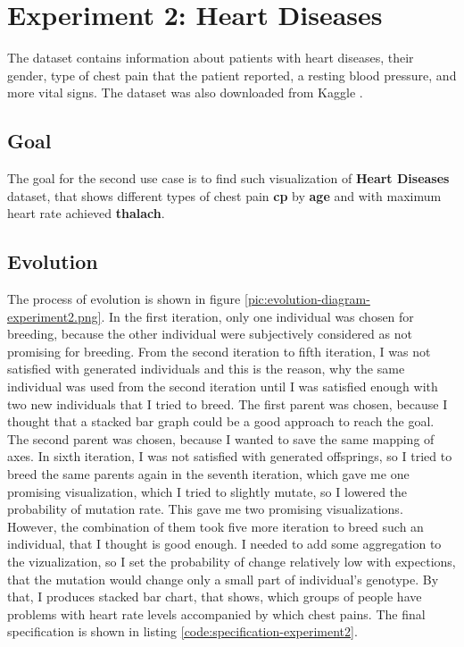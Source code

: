 \clearpage

\section{Experiment 2: Heart Diseases}
The dataset contains information about patients with heart diseases, their gender, type of chest pain that the patient reported, a resting blood pressure, and more vital signs. The dataset was also downloaded from Kaggle \cite{heart-diseases}.
\subsection{Goal}
The goal for the second use case is to find such visualization of \textbf{Heart Diseases} dataset, that shows different types of chest pain \textbf{cp} by \textbf{age} and with maximum heart rate achieved \textbf{thalach}.
\subsection{Evolution}
The process of evolution is shown in figure \ref{pic:evolution-diagram-experiment2.png}. In the first iteration, only one individual was chosen for breeding, because the other individual were subjectively considered as not promising for breeding. From the second iteration to fifth iteration, I was not satisfied with generated individuals and this is the reason, why the same individual was used from the second iteration until I was satisfied enough with two new individuals that I tried to breed. The first parent was chosen, because I thought that a stacked bar graph could be a good approach to reach the goal. The second parent was chosen, because I wanted to save the same mapping of axes. In sixth iteration, I was not satisfied with generated offsprings, so I tried to breed the same parents again in the seventh iteration, which gave me one promising visualization, which I tried to slightly mutate, so I lowered the probability of mutation rate. This gave me two promising visualizations. However, the combination of them took five more iteration to breed such an individual, that I thought is good enough. I needed to add some aggregation to the vizualization, so I set the probability of change relatively low with expections, that the mutation would change only a small part of individual's genotype. By that, I produces stacked bar chart, that shows, which groups of people have problems with heart rate levels accompanied by which chest pains. The final specification is shown in listing \ref{code:specification-experiment2}.

